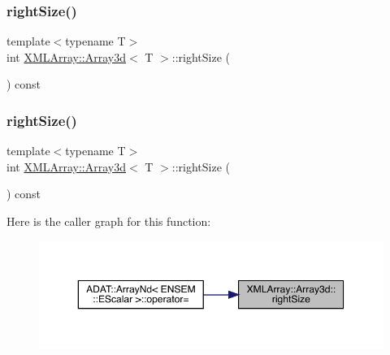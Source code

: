 \subsubsection{\texorpdfstring{rightSize()}{rightSize()}\hspace{0.1cm}{\footnotesize\ttfamily [2/3]}}
{\footnotesize\ttfamily template$<$typename T$>$ \\
int \mbox{\hyperlink{classXMLArray_1_1Array3d}{X\+M\+L\+Array\+::\+Array3d}}$<$ T $>$\+::right\+Size (\begin{DoxyParamCaption}{ }\end{DoxyParamCaption}) const\hspace{0.3cm}{\ttfamily [inline]}}

\mbox{\label{classXMLArray_1_1Array3d_a19c4d18fb2ee0f0ee27631f0aa35ccdc}} 
\subsubsection{\texorpdfstring{rightSize()}{rightSize()}\hspace{0.1cm}{\footnotesize\ttfamily [3/3]}}
{\footnotesize\ttfamily template$<$typename T$>$ \\
int \mbox{\hyperlink{classXMLArray_1_1Array3d}{X\+M\+L\+Array\+::\+Array3d}}$<$ T $>$\+::right\+Size (\begin{DoxyParamCaption}{ }\end{DoxyParamCaption}) const\hspace{0.3cm}{\ttfamily [inline]}}

Here is the caller graph for this function\+:
\nopagebreak
\begin{figure}[H]
\begin{center}
\leavevmode
\includegraphics[width=350pt]{db/da0/classXMLArray_1_1Array3d_a19c4d18fb2ee0f0ee27631f0aa35ccdc_icgraph}
\end{center}
\end{figure}
\mbox{\label{classXMLArray_1_1Array3d_aa084cbb2756e62556c9ec4c4cb971bf0}} 
